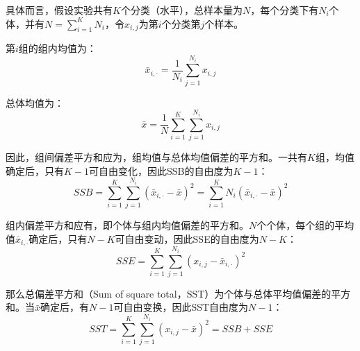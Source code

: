 \documentclass[11pt]{article}
\begin{document}
具体而言，假设实验共有$K$个分类（水平），总样本量为$N$，每个分类下有$N_i$个体，并有$N=\sum_{i=1}^{K}N_i$，令$x_{i,j}$为第$i$个分类第$j$个样本。

第$i$组的组内均值为：
\begin{equation*}
    \bar{x}_{i,\cdot} = \frac{1}{N_i} \sum_{j=1}^{N_i} x_{i,j}
\end{equation*}

总体均值为：
\begin{equation*}
    \bar{x} = \frac{1}{N} \sum_{i=1}^{K} \sum_{j=1}^{N_i} x_{i,j}
\end{equation*}

因此，组间偏差平方和应为，组均值与总体均值偏差的平方和。一共有$K$组，均值确定后，只有$K-1$可自由变化，因此SSB的自由度为$K-1$：
\begin{equation*}
    SSB = \sum_{i=1}^{K}\sum_{j=1}^{N_i} (\bar{x}_{i,\cdot} - \bar{x})^2 = 
    \sum_{i=1}^{K} N_i ( \bar{x}_{i,\cdot} - \bar{x})^2
\end{equation*}

组内偏差平方和应有，即个体与组内均值偏差的平方和。$N$个个体，每个组的平均值$\bar{x}_{i,\cdot}$确定后，只有$N-K$可自由变动，因此SSE的自由度为$N-K$：
\begin{equation*}
    SSE = \sum_{i=1}^{K}\sum_{j=1}^{N_i} (x_{i,j} - \bar{x}_{i,\cdot})^2
\end{equation*}

那么总偏差平方和（Sum of square total，SST）为个体与总体平均值偏差的平方和。当$\bar{x}$确定后，有$N-1$可自由变换，因此SST自由度为$N-1$：
\begin{equation*}
    SST = \sum_{i=1}^{K}\sum_{j=1}^{N_i} (x_{i,j} - \bar{x})^2 = SSB + SSE
\end{equation*}
\end{document}
